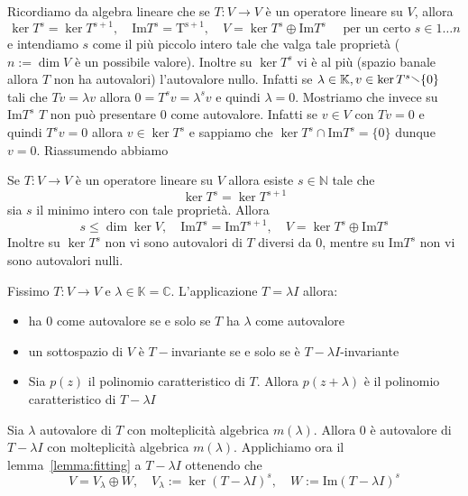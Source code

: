 Ricordiamo da algebra lineare che se \(T : V \to  V\) è un operatore lineare su
\(V\), allora
\[
    \ker T^{s} = \ker T^{s+1}, \quad \mathrm{Im} T^{s} = \mathrm{T^{s+1}}, \quad V = \ker T^{s} \oplus \mathrm{Im} T^{s} \quad \text{ per un certo } s \in
    1\dots n
\]
e intendiamo \(s\) come il più piccolo intero tale che valga tale proprietà
(\(n := \dim V\) è un possibile valore). Inoltre su \(\ker T^{s}\) vi è al più
(spazio banale allora \(T\) non ha autovalori) l'autovalore nullo. Infatti se
\(\lambda \in \mathbb{K}, v \in \ker T^{s}\sminus \{0\} \) tali che \(Tv =
\lambda v\) allora \(0 = T^{s}v = \lambda^{s}v\) e quindi \(\lambda = 0\).
Mostriamo che invece su \(\mathrm{Im} T^{s}\) \(T\) non può presentare 0 come
autovalore. Infatti se \(v \in V\)
con \(Tv = 0\) e quindi \(T^{s}v = 0\) allora \(v \in \ker T^{s}\) e sappiamo
che \(\ker T^{s} \cap \mathrm{Im} T^{s} = \{0\}\) dunque \(v = 0\). Riassumendo
abbiamo
\begin{lemmao}
    Se \(T : V \to V\) è un operatore lineare su \(V\) allora esiste \(s \in
    \mathbb{N}\)
    tale che
    \[
      \ker T^{s} = \ker T^{s+1}
    \]
    sia \(s\)  il minimo intero con tale proprietà. Allora
    \[
        s \le \dim \ker V, \quad \mathrm{Im} T^{s} = \mathrm{Im} T^{s+1}, \quad
        V = \ker T^{s} \oplus \mathrm{Im} T^{s}
    \]
    Inoltre su \(\ker T^{s}\) non vi sono autovalori di \(T\) diversi da 0, mentre su
    \(\mathrm{Im} T^{s}\) non vi sono autovalori nulli.
\end{lemmao}
Fissimo \(T : V \to V\) e \(\lambda \in \mathbb{K} = \mathbb{C}\).
L'applicazione \(T = \lambda I\) allora:
\begin{itemize}[label = --]
    \item ha 0 come autovalore se e solo se \(T\) ha
\(\lambda\) come autovalore 
    \item un sottospazio di \(V\) è \(T-\)invariante se e solo se è \(T -
        \lambda I\)-invariante
    \item Sia \(p{(z)}\) il polinomio caratteristico di \(T\). Allora
        \(p{(z+\lambda)}\) è il polinomio caratteristico di \(T - \lambda I\) 
\end{itemize}
Sia \(\lambda\) autovalore di \(T\) con molteplicità algebrica \(m
{(\lambda)}\). Allora 0 è autovalore di \(T - \lambda I\) con molteplicità
algebrica \(m {(\lambda)}\). Applichiamo ora il lemma~\ref{lemma:fitting} a \(T
- \lambda I\) ottenendo che 
\[
  V = V_\lambda \oplus W, \quad V_\lambda := \ker {(T - \lambda I)}^s, 
   \quad W := \mathrm{Im} {(T - \lambda I)}^s
\]
